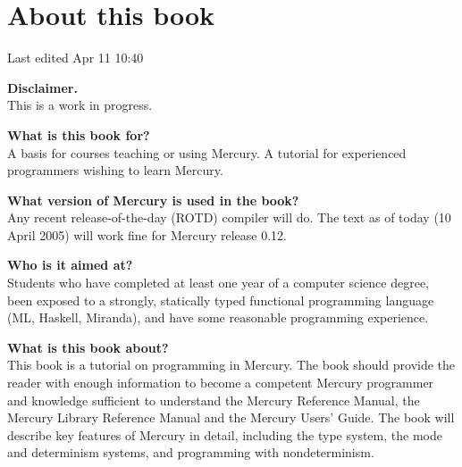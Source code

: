 \documentclass[a4paper,11pt,notitlepage,onecolumn]{book}
\begin{document}
% 

\newcommand{\polytexopenbrace}%
{\{}
\newcommand{\polytexclosebrace}%
{\}}
\newcommand{\polytexampersand}%
{\&}

\setcounter{chapter}{-1}



\chapter{About this book}

Last edited Apr 11 10:40

\textbf{Disclaimer.}
\\
This is a work in progress.

\textbf{What is this book for?}
\\
A basis for courses teaching or using Mercury.  A tutorial for
experienced programmers wishing to learn Mercury.

\textbf{What version of Mercury is used in the book?}
\\
Any recent release-of-the-day (ROTD) compiler will do.  The text as of today
(10 April 2005) will work fine for Mercury release 0.12.

\textbf{Who is it aimed at?}
\\
Students who have completed at least one year of a computer science
degree, been exposed to a strongly, statically typed functional programming
language (\eg ML, Haskell, Miranda), and have some reasonable programming
experience.

\textbf{What is this book about?}
\\
This book is a tutorial on programming in Mercury.  The book should
provide the reader with enough information to become a competent Mercury
programmer and knowledge sufficient to understand the Mercury Reference
Manual, the Mercury Library Reference Manual and the Mercury Users' Guide.
The book will describe key features of Mercury in detail, including the type
system, the mode and determinism systems, and programming with
nondeterminism.
\end{document}
